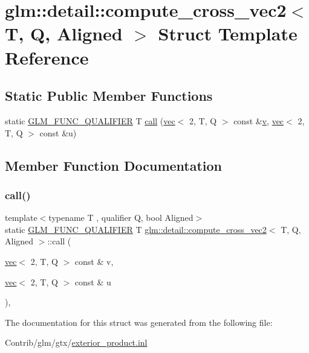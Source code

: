 \hypertarget{structglm_1_1detail_1_1compute__cross__vec2}{}\section{glm\+:\+:detail\+:\+:compute\+\_\+cross\+\_\+vec2$<$ T, Q, Aligned $>$ Struct Template Reference}
\label{structglm_1_1detail_1_1compute__cross__vec2}
\subsection*{Static Public Member Functions}
\begin{DoxyCompactItemize}
\item 
static \mbox{\hyperlink{setup_8hpp_a33fdea6f91c5f834105f7415e2a64407}{G\+L\+M\+\_\+\+F\+U\+N\+C\+\_\+\+Q\+U\+A\+L\+I\+F\+I\+ER}} T \mbox{\hyperlink{structglm_1_1detail_1_1compute__cross__vec2_a97f072d3e14a20f16871c54d74a6096a}{call}} (\mbox{\hyperlink{structglm_1_1vec}{vec}}$<$ 2, T, Q $>$ const \&\mbox{\hyperlink{_s_d_l__opengl_8h_a10a82eabcb59d2fcd74acee063775f90}{v}}, \mbox{\hyperlink{structglm_1_1vec}{vec}}$<$ 2, T, Q $>$ const \&u)
\end{DoxyCompactItemize}


\subsection{Member Function Documentation}
\mbox{\label{structglm_1_1detail_1_1compute__cross__vec2_a97f072d3e14a20f16871c54d74a6096a}} 
\subsubsection{\texorpdfstring{call()}{call()}}
{\footnotesize\ttfamily template$<$typename T , qualifier Q, bool Aligned$>$ \\
static \mbox{\hyperlink{setup_8hpp_a33fdea6f91c5f834105f7415e2a64407}{G\+L\+M\+\_\+\+F\+U\+N\+C\+\_\+\+Q\+U\+A\+L\+I\+F\+I\+ER}} T \mbox{\hyperlink{structglm_1_1detail_1_1compute__cross__vec2}{glm\+::detail\+::compute\+\_\+cross\+\_\+vec2}}$<$ T, Q, Aligned $>$\+::call (\begin{DoxyParamCaption}\item[{\mbox{\hyperlink{structglm_1_1vec}{vec}}$<$ 2, T, Q $>$ const \&}]{v,  }\item[{\mbox{\hyperlink{structglm_1_1vec}{vec}}$<$ 2, T, Q $>$ const \&}]{u }\end{DoxyParamCaption})\hspace{0.3cm}{\ttfamily [inline]}, {\ttfamily [static]}}



The documentation for this struct was generated from the following file\+:\begin{DoxyCompactItemize}
\item 
Contrib/glm/gtx/\mbox{\hyperlink{exterior__product_8inl}{exterior\+\_\+product.\+inl}}\end{DoxyCompactItemize}
